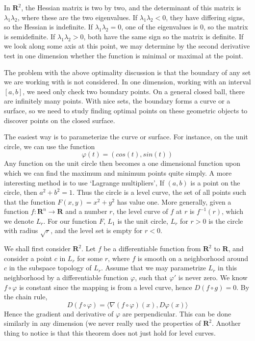 In $\mathbf{R}^2$, the Hessian matrix is two by two, and the determinant of this matrix is $\lambda_1 \lambda_2$, where these are the two eigenvalues. If $\lambda_1 \lambda_2 < 0$, they have differing signs, so the Hessian is indefinite. If $\lambda_1 \lambda_2 = 0$, one of the eigenvalues is 0, so the matrix is semidefinite. If $\lambda_1 \lambda_2 > 0$, both have the same sign so the matrix is definite. If we look along some axis at this point, we may determine by the second derivative test in one dimension whether the function is minimal or maximal at the point.

The problem with the above optimality discussion is that the boundary of any set we are working with is not considered. In one dimension, working with an interval $[a,b]$, we need only check two boundary points. On a general closed ball, there are infinitely many points. With nice sets, the boundary forms a curve or a surface, so we need to study finding optimal points on these geometric objects to discover points on the closed surface.

The easiest way is to parameterize the curve or surface. For instance, on the unit circle, we can use the function
%
\[ \varphi(t) = (cos(t), sin(t)) \]
%
Any function on the unit circle then becomes a one dimensional function upon which we can find the maximum and minimum points quite simply. A more interesting method is to use `Lagrange multipliers', If $(a,b)$ is a point on the circle, then $a^2 + b^2 = 1$. Thus the circle is a level curve, the set of all points such that the function $F(x,y) = x^2 + y^2$ has value one. More generally, given a function $f:\mathbf{R}^n \to \mathbf{R}$ and a number $r$, the level curve of $f$ at $r$ is $f^{-1}(r)$, which we denote $L_r$. For our function $F$, $L_1$ is the unit circle, $L_r$ for $r > 0$ is the circle with radius $\sqrt{r}$, and the level set is empty for $r < 0$.

We shall first consider $\mathbf{R}^2$. Let $f$ be a differentiable function from $\mathbf{R}^2$ to $\mathbf{R}$, and consider a point $c$ in $L_r$ for some $r$, where $f$ is smooth on a neighborhood around $c$ in the subspace topology of $L_r$. Assume that we may parametrize $L_r$ in this neighborhood by a differentiable function $\varphi$, such that $\varphi'$ is never zero. We know $f \circ \varphi$ is constant since the mapping is from a level curve, hence $D(f \circ g) = 0$. By the chain rule,
%
\[ D(f \circ \varphi) = \langle \nabla (f \circ \varphi)(x), D\varphi(x) \rangle \]
%
Hence the gradient and derivative of $\varphi$ are perpendicular. This can be done similarly in any dimension (we never really used the properties of $\mathbf{R}^2$. Another thing to notice is that this theorem does not just hold for level curves.

